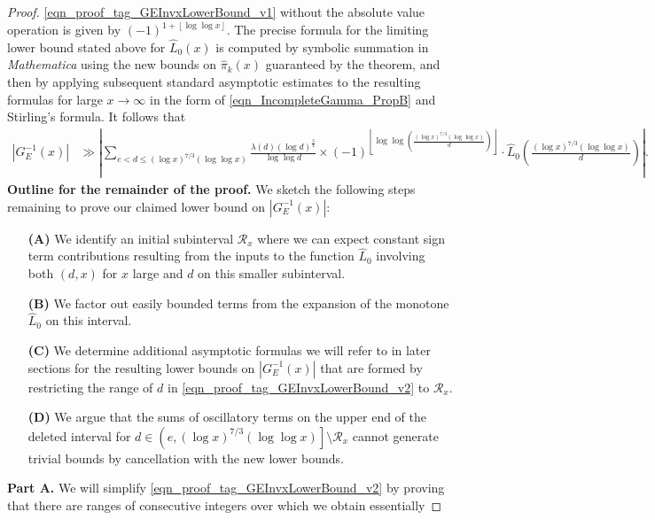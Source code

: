 \documentclass[11pt,reqno,a4letter]{article}
\numberwithin{figure}{section}
\numberwithin{table}{section}
\newcommand{\floor}[1]{\left\lfloor #1 \right\rfloor}
\theoremstyle{plain}
\numberwithin{theorem}{section}
\theoremstyle{definition}
\begin{document}
\begin{proof}
\eqref{eqn_proof_tag_GEInvxLowerBound_v1} without the 
absolute value operation is given by $(-1)^{1+\floor{\log\log x}}$. 
The precise formula for the 
limiting lower bound stated above for $\widehat{L}_0(x)$ is computed by symbolic summation 
in \emph{Mathematica} using the new bounds on $\widehat{\pi}_k(x)$ guaranteed by 
the theorem, and then by applying subsequent standard asymptotic estimates to the 
resulting formulas for large $x \rightarrow \infty$ 
in the form of \eqref{eqn_IncompleteGamma_PropB} and Stirling's formula. 
It follows that 
\begin{align} 
\label{eqn_proof_tag_GEInvxLowerBound_v2} 
|G_E^{-1}(x)| & \gg \left\lvert \sum_{e < d \leq (\log x)^{7/3} (\log\log x)} 
     \frac{\lambda(d) (\log d)^{\frac{3}{4}}}{\log\log d} \times 
     (-1)^{\floor{\log\log\left(\frac{(\log x)^{7/3} (\log\log x)}{d}\right)}} \cdot 
     \widehat{L}_0\left(\frac{(\log x)^{7/3} (\log\log x)}{d}\right) \right\rvert. 
\end{align} 
\textbf{Outline for the remainder of the proof.} 
We sketch the following steps remaining to prove our claimed lower bound on 
$|G_E^{-1}(x)|$: 
\begin{itemize}[itemsep=0pt,topsep=4pt,leftmargin=0.75in] 
\item[\textbf{(A)}] We identify an initial subinterval $\mathcal{R}_x$ where we can expect 
     constant sign term contributions resulting from the inputs to the function $\widehat{L}_0$ 
     involving both $(d, x)$ for $x$ large and $d$ on this smaller subinterval. 
\item[\textbf{(B)}] We factor out easily bounded terms from the expansion of the 
     monotone $\widehat{L}_0$ on this interval. 
\item[\textbf{(C)}] We determine additional asymptotic formulas we will 
     refer to in later sections for the resulting lower bounds on $|G_E^{-1}(x)|$ 
     that are formed by restricting the range of $d$ in 
     \eqref{eqn_proof_tag_GEInvxLowerBound_v2} to $\mathcal{R}_x$. 
\item[\textbf{(D)}] We argue 
     that the sums of oscillatory terms on the upper end of the deleted interval 
     for $d \in \left(e, (\log x)^{7/3} (\log\log x)\right] \setminus \mathcal{R}_x$ 
     cannot generate trivial bounds by cancellation with the new lower bounds. 
\end{itemize} 
\textbf{Part A.} 
We will simplify \eqref{eqn_proof_tag_GEInvxLowerBound_v2} by proving that there are 
ranges of consecutive integers over which we obtain essentially 

\end{proof}
\end{document}
